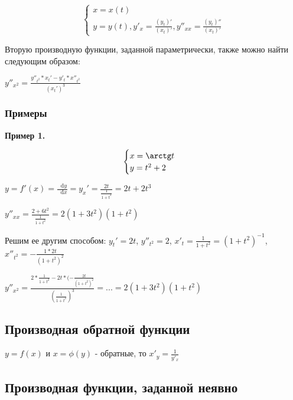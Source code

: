 \documentclass{article}
\newcommand*\diff{\mathop{}\!\mathrm{d}}
\begin{document}
\begin{flushleft}

\begin{equation}
    \begin{cases}
        x = x(t) \\
        y = y(t), y'_x = \frac{(y_t)'}{(x_t)'}, y''_{xx} = \frac{(y_t)''}{(x_t)'}
    \end{cases}
\end{equation}

Вторую производную функции, заданной параметрически, также можно найти следующим образом:

$y''_{x^2} = \frac{y''_{t^2} * x_t' - y'_t * x''_{t^2}}{(x_t')^3}$

\subsubsection{Примеры}

\textbf{Пример 1.}

\begin{equation}
    \begin{cases}
        x = \arctg t \\
        y = t^2 + 2
    \end{cases}
\end{equation}

$y = f'(x) = \frac{\diff y}{\diff x} = y_x' = \frac{2t}{\frac{1}{1 + t^2}} = 2t + 2t^3$

$y''_{xx} = \frac{2 + 6t^2}{\frac{1}{1 + t^2}} = 2(1 + 3t^2)(1 + t^2)$

\hfill

Решим ее другим способом: $y_t' = 2t$, $y''_{t^2} = 2$, $x'_t = \frac{1}{1 + t^2} = (1 + t^2)^{-1}$, $x''_{t^2} = -\frac{1 * 2t}{(1 + t^2)^2}$

$y''_{x^2} = \frac{2 * \frac{1}{1 + t^2} - 2t * (-\frac{2t}{(1+t^2)^2}}{(\frac{1}{1 + t^2})^3} = ... = 2(1 + 3t^2)(1 + t^2)$

\subsection{Производная обратной функции}

$y = f(x)$ и $x = \phi(y)$ - обратные, то $x'_y = \frac{1}{y'_{x}}$

\subsection{Производная функции, заданной неявно}


\end{flushleft}
\end{document}
